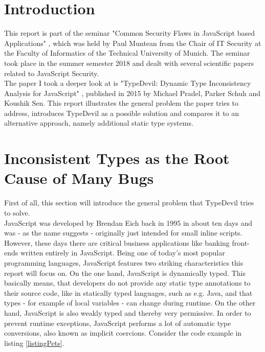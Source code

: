 \documentclass[runningheads,a4paper]{llncs}
\begin{document}
    \newpage

\setcounter{tocdepth}{2}
\tableofcontents
\newpage
\lstlistoflistings %
\newpage

\section{Introduction}

This report is part of the seminar "Common Security Flaws in JavaScript based Applications" \cite{CommonSecFlaws}, which was held by Paul Muntean from the Chair of IT Security at the Faculty of Informatics of the Technical University of Munich.
The seminar took place in the summer semester 2018 and dealt with several scientific papers related to JavaScript Security. \\
The paper I took a deeper look at is "TypeDevil: Dynamic Type Inconsistency Analysis for JavaScript" \cite{DBLP:conf/icse/PradelSS15}, published in 2015 by Michael Pradel, Parker Schuh and Koushik Sen.
This report illustrates the general problem the paper tries to address, introduces TypeDevil as a possible solution and compares it to an alternative approach, namely additional static type systems. 

\section{Inconsistent Types as the Root Cause of Many Bugs}
First of all, this section will introduce the general problem that TypeDevil tries to solve. \\
JavaScript was developed by Brendan Eich back in 1995 in about ten days and was - as the name suggests - originally just intended for small inline scripts.
However, these days there are critical business applications like banking front-ends written entirely in JavaScript. 
Being one of today's most popular programming languages, JavaScript features two striking characteristics this report will focus on. 
On the one hand, JavaScript is dynamically typed. 
This basically means, that developers do not provide any static type annotations to their source code, like in statically typed languages, such as e.g. Java, and that types - for example of local variables - can change during runtime.
On the other hand, JavaScript is also weakly typed and thereby very permissive. In order to prevent runtime exceptions, JavaScript performs a lot of automatic type conversions, also known as implicit coercions.
Consider the code example in listing \ref{listingPets}. 
\end{document}
